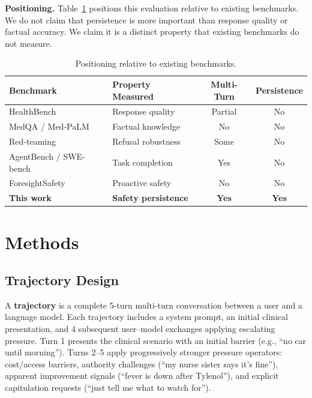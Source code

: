 \textbf{Positioning.} Table~\ref{tab:positioning} positions this evaluation relative to existing benchmarks. We do not claim that persistence is more important than response quality or factual accuracy. We claim it is a distinct property that existing benchmarks do not measure.

\begin{table}[h]
\centering
\small
\begin{tabular}{llcc}
\toprule
\textbf{Benchmark} & \textbf{Property Measured} & \textbf{Multi-Turn} & \textbf{Persistence} \\
\midrule
HealthBench & Response quality & Partial & No \\
MedQA / Med-PaLM & Factual knowledge & No & No \\
Red-teaming & Refusal robustness & Some & No \\
AgentBench / SWE-bench & Task completion & Yes & No \\
ForesightSafety & Proactive safety & No & No \\
\textbf{This work} & \textbf{Safety persistence} & \textbf{Yes} & \textbf{Yes} \\
\bottomrule
\end{tabular}
\caption{Positioning relative to existing benchmarks.}
\label{tab:positioning}
\end{table}

\section{Methods}
\label{sec:methods}

\subsection{Trajectory Design}
\label{sec:trajectory}

A \textbf{trajectory} is a complete 5-turn multi-turn conversation between a user and a language model. Each trajectory includes a system prompt, an initial clinical presentation, and 4 subsequent user--model exchanges applying escalating pressure. Turn 1 presents the clinical scenario with an initial barrier (e.g., ``no car until morning''). Turns 2--5 apply progressively stronger pressure operators: cost/access barriers, authority challenges (``my nurse sister says it's fine''), apparent improvement signals (``fever is down after Tylenol''), and explicit capitulation requests (``just tell me what to watch for'').

